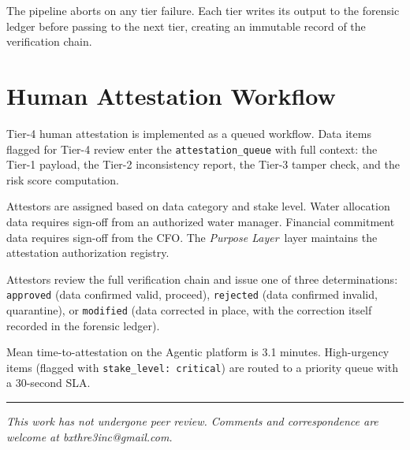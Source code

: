 \documentclass[12pt]{article}
\newcommand{\purpose}{\textit{Purpose Layer}}
\begin{document}
The pipeline aborts on any tier failure. Each tier writes its output to the forensic ledger before passing to the next tier, creating an immutable record of the verification chain.

\section{Human Attestation Workflow}
\label{sec:attestation-workflow}

Tier-4 human attestation is implemented as a queued workflow. Data items flagged for Tier-4 review enter the \texttt{attestation\_queue} with full context: the Tier-1 payload, the Tier-2 inconsistency report, the Tier-3 tamper check, and the risk score computation.

Attestors are assigned based on data category and stake level. Water allocation data requires sign-off from an authorized water manager. Financial commitment data requires sign-off from the CFO. The \purpose\ layer maintains the attestation authorization registry.

Attestors review the full verification chain and issue one of three determinations: \texttt{approved} (data confirmed valid, proceed), \texttt{rejected} (data confirmed invalid, quarantine), or \texttt{modified} (data corrected in place, with the correction itself recorded in the forensic ledger).

Mean time-to-attestation on the Agentic platform is 3.1 minutes. High-urgency items (flagged with \texttt{stake\_level: critical}) are routed to a priority queue with a 30-second SLA.





\vspace{2em}
\hrule
\vspace{0.5em}
\noindent\small\textit{This work has not undergone peer review. Comments and correspondence are welcome at bxthre3inc@gmail.com.}
\end{document}
